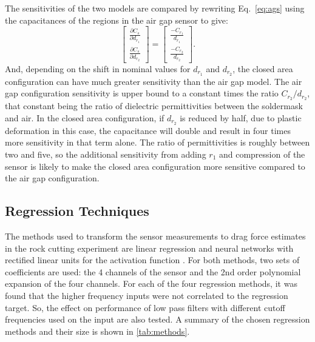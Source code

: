 The sensitivities of the two models are compared by rewriting Eq.~\ref{eq:ags}
using the capacitances of the regions in the air gap sensor to give:
\begin{equation}
\begin{bmatrix}
\frac{\partial C_s}{\partial d_{r_1}} \\[1em]
\frac{\partial C_s}{\partial d_{r_2}} \end{bmatrix} = 
\begin{bmatrix}
\frac{-C_{r_1}}{d_{r_1}} \\[1em]
\frac{-C_{r_2}}{d_{r_2}}
\end{bmatrix}.
\end{equation}
And, depending on the shift in nominal values for $d_{r_1}$ and $d_{r_2}$, the closed area configuration 
can have much greater sensitivity than the air gap model. 
The air gap configuration sensitivity is upper bound to a constant times the ratio $C_{r_2} / d_{r_2}$, 
that constant being the ratio of dielectric permittivities between the soldermask and air.
In the closed area configuration, if $d_{r_2}$ is reduced by half,
due to plastic deformation in this case, 
the capacitance will double and result in four times more sensitivity in that term alone.
The ratio of permittivities is roughly between two and five, so 
the additional sensitivity from adding $r_1$ and compression of the sensor
is likely to make the closed area configuration more sensitive compared to the air gap configuration.

\subsection{Regression Techniques \label{sub:reg}}

The methods used to transform the sensor measurements to drag force estimates 
in the rock cutting experiment are linear regression \cite{Maulud2020} 
and neural networks with rectified linear units for the activation function \cite{Hu2019, Hara2015}. 
For both methods, two sets of coefficients are used: the 4 channels of the sensor 
and the 2nd order polynomial expansion of the four channels. 
For each of the four regression methods, it was found that 
the higher frequency inputs were not correlated to the regression target.
So, the effect on performance of low pass filters with different cutoff frequencies 
used on the input are also tested.
A summary of the chosen regression methods and their size is shown in \ref{tab:methods}.


